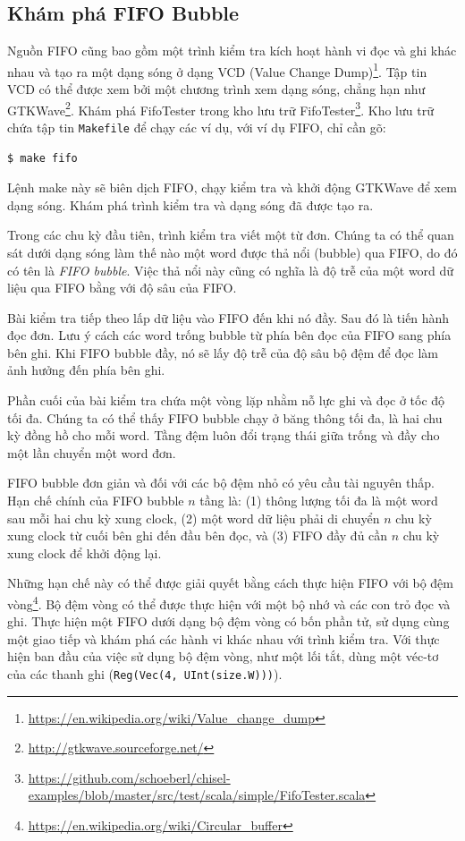 \documentclass[%
    10pt,
    headinclude, footexclude,
    openright, %
    notitlepage,
    cleardoubleempty,
    headsepline,
    pointlessnumbers,
    bibtotoc, idxtotoc,
    ]{scrbook}
\newcommand{\code}[1]{{\small{\texttt{#1}}}}
\newcommand{\myref}[2]{\href{#1}{#2}}
\renewcommand{\myref}[2]{{#2}{\footnote{\url{#1}}}}
\begin{document}
\subsection{Khám phá FIFO Bubble}

Nguồn FIFO cũng bao gồm một trình kiểm tra kích hoạt hành vi đọc và ghi khác nhau và tạo ra một dạng sóng ở dạng
\myref{https://en.wikipedia.org/wiki/Value_change_dump}{VCD (Value Change Dump)}.
Tập tin VCD có thể được xem bởi một chương trình xem dạng sóng, chẳng hạn như
\myref{http://gtkwave.sourceforge.net/}{GTKWave}.
Khám phá FifoTester trong kho lưu trữ
\myref{https://github.com/schoeberl/chisel-examples/blob/master/src/test/scala/simple/FifoTester.scala}{FifoTester}.
Kho lưu trữ chứa tập tin \code{Makefile} để chạy các ví dụ, với ví dụ FIFO, chỉ cần gõ:
\begin{verbatim}
$ make fifo
\end{verbatim}
Lệnh make này sẽ biên dịch FIFO, chạy kiểm tra và khởi động GTKWave để xem dạng sóng. Khám phá trình kiểm tra và dạng sóng đã được tạo ra.

Trong các chu kỳ đầu tiên, trình kiểm tra viết một từ đơn. Chúng ta có thể quan sát dưới dạng sóng làm thế nào một word được thả nổi (bubble) qua FIFO, do đó có tên là \emph{FIFO bubble}. Việc thả nổi này cũng có nghĩa là độ trễ của một word dữ liệu qua FIFO bằng với độ sâu của FIFO.

Bài kiểm tra tiếp theo lấp dữ liệu vào FIFO đến khi nó đầy. Sau đó là tiến hành đọc đơn. Lưu ý cách các word trống bubble từ phía bên đọc của FIFO sang phía bên ghi. Khi FIFO bubble đầy, nó sẽ lấy độ trễ của độ sâu bộ đệm để đọc làm ảnh hưởng đến phía bên ghi. 

Phần cuối của bài kiểm tra chứa một vòng lặp nhằm nỗ lực ghi và đọc ở tốc độ tối đa. Chúng ta có thể thấy FIFO bubble chạy ở băng thông tối đa, là hai chu kỳ đồng hồ cho mỗi word. Tầng đệm luôn đổi trạng thái giữa trống và đầy cho một lần chuyển một word đơn.

FIFO bubble đơn giản và đối với các bộ đệm nhỏ có yêu cầu tài nguyên thấp. Hạn chế chính của FIFO bubble $n$ tầng là: (1) thông lượng tối đa là một word sau mỗi hai chu kỳ xung clock, (2) một word dữ liệu phải di chuyển $n$ chu kỳ xung clock từ cuối bên ghi đến đầu bên đọc, và (3) FIFO đầy đủ cần $n$ chu kỳ xung clock để khởi động lại. 

Những hạn chế này có thể được giải quyết bằng cách thực hiện FIFO với \myref{https://en.wikipedia.org/wiki/Circular_buffer}{bộ đệm vòng}.
Bộ đệm vòng có thể được thực hiện với một bộ nhớ và các con trỏ đọc và ghi. Thực hiện một FIFO dưới dạng bộ đệm vòng có bốn phần tử, sử dụng cùng một giao tiếp và khám phá các hành vi khác nhau với trình kiểm tra. Với thực hiện ban đầu của việc sử dụng bộ đệm vòng, như một lối tắt, dùng một véc-tơ của các thanh ghi (\code{Reg(Vec(4, UInt(size.W)))}).
\end{document}
